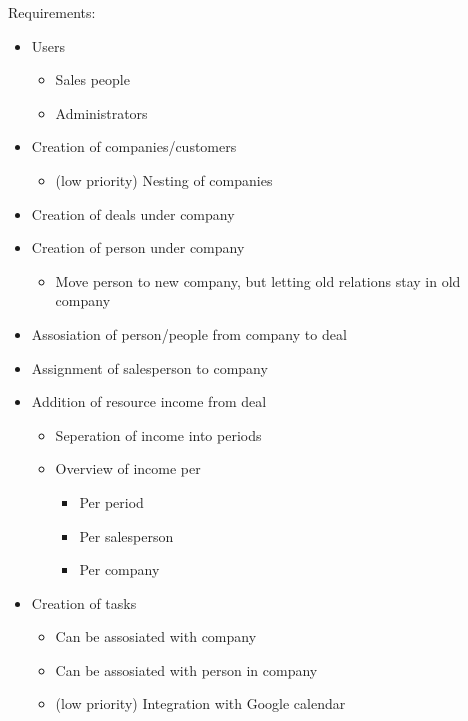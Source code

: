 Requirements:
\begin{itemize}
  \item Users
  \begin{itemize}
    \item Sales people
    \item Administrators
  \end{itemize}
  \item Creation of companies/customers
  \begin{itemize}
    \item (low priority) Nesting of companies
  \end{itemize}
  \item Creation of deals under company
  \item Creation of person under company
  \begin{itemize}
    \item Move person to new company, but letting old relations stay in old company
  \end{itemize}
  \item Assosiation of person/people from company to deal
  \item Assignment of salesperson to company
  \item Addition of resource income from deal
  \begin{itemize}
    \item Seperation of income into periods
    \item Overview of income per
    \begin{itemize}
      \item Per period
      \item Per salesperson
      \item Per company
    \end{itemize}
  \end{itemize}
  \item Creation of tasks
  \begin{itemize}
    \item Can be assosiated with company
    \item Can be assosiated with person in company
    \item (low priority) Integration with Google calendar
  \end{itemize}
\end{itemize}
